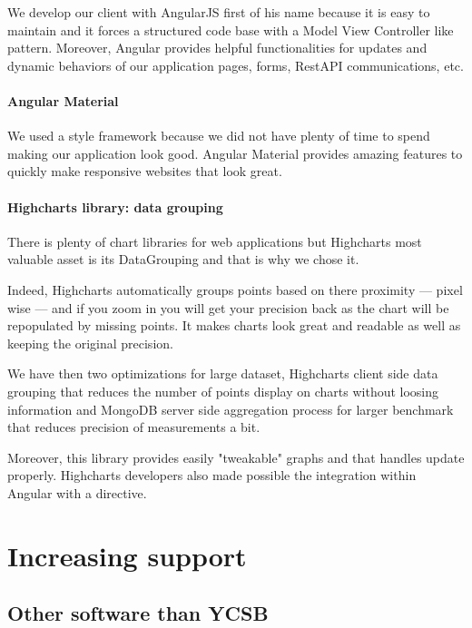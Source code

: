 \documentclass[a4paper,11pt]{report}
\begin{document}
We develop our client with AngularJS first of his name because it is easy to maintain and it forces a structured code base with a Model View Controller like pattern. Moreover, Angular provides helpful functionalities for updates and dynamic behaviors of our application pages, forms, RestAPI communications, etc. \cite{angular:website}

\paragraph{Angular Material} We used a style framework because we did not have plenty of time to spend making our application look good. Angular Material provides amazing features to quickly make responsive websites that look great.

\paragraph{Highcharts library: data grouping}\label{data_grouping} There is plenty of chart libraries for web applications but Highcharts most valuable asset is its DataGrouping and that is why we chose it.

Indeed, Highcharts automatically groups points based on there proximity --- pixel wise --- and if you zoom in you will get your precision back as the chart will be repopulated by missing points. It makes charts look great and readable as well as keeping the original precision.

We have then two optimizations for large dataset, Highcharts client side data grouping that reduces the number of points display on charts without loosing information and MongoDB server side aggregation process for larger benchmark that reduces precision of measurements a bit.

Moreover, this library provides easily "tweakable" graphs and that handles update properly. Highcharts developers also made possible the integration within Angular with a directive.

\clearpage

\section{Increasing support}

\subsection{Other software than YCSB}
\end{document}
